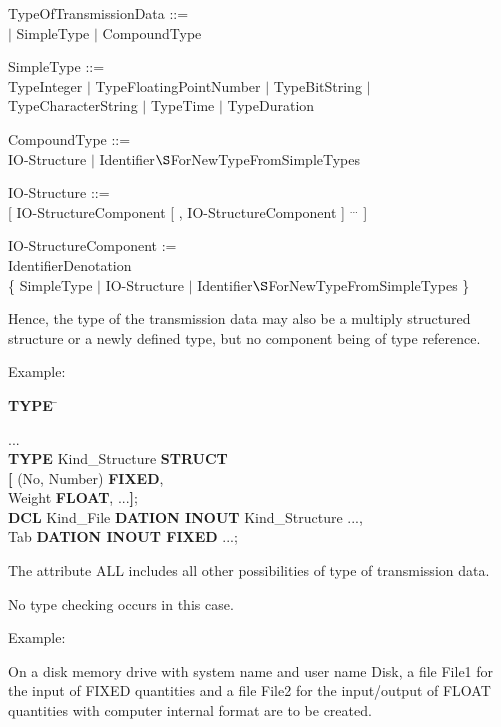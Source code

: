 TypeOfTransmissionData ::=\\
 $\mid$ SimpleType $\mid$ CompoundType

SimpleType ::= \\
\x TypeInteger $\mid$ TypeFloatingPointNumber $\mid$ TypeBitString $\mid$\\
\x TypeCharacterString $\mid$ TypeTime $\mid$ TypeDuration

CompoundType ::= \\
\x IO-Structure $\mid$ Identifier$\S $ForNewTypeFromSimpleTypes

IO-Structure ::=\\
 [ IO-StructureComponent [ , IO-StructureComponent ] $^{...}$ ]

IO-StructureComponent := \\
\x IdentifierDenotation\\
\x \{ SimpleType $\mid$ IO-Structure $\mid$ Identifier$\S $ForNewTypeFromSimpleTypes \}

Hence, the type of the transmission data may also be a multiply
structured structure or a newly defined type, but no component being of
type reference.

Example:

\begin{tabbing}
{\bf TYPE} \= \kill

...        \> \\
{\bf TYPE} \> Kind\_Structure {\bf STRUCT} \\
    \> {\bf [} (No, Number) {\bf FIXED},\\
    \> \x Weight {\bf FLOAT}, ...{\bf ]};\\
{\bf DCL}  \> Kind\_File {\bf DATION INOUT} Kind\_Structure ...,\\
    \> Tab {\bf DATION INOUT FIXED} ...;
\end{tabbing}

The attribute ALL includes all other possibilities of type of
transmission data.
\begin{accepted}
No type checking occurs in this case.
\end{accepted}

Example:

On a disk memory drive with system name 
  and user name Disk, a file
File1 for the input of FIXED quantities and a file File2 for the
input/output of FLOAT quantities with computer internal format are to be
created.

